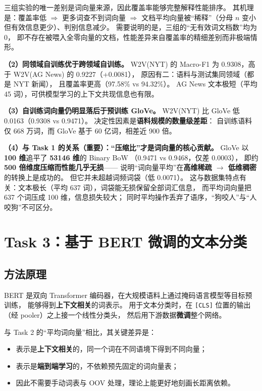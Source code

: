 \documentclass[12pt,a4paper]{ctexart}
\newcommand{\fpath}[1]{\texttt{#1}}
\begin{document}
三组实验的唯一差别是词向量来源，因此覆盖率能够完整解释性能排序。
其机理是：覆盖率低 $\Rightarrow$ 更多词查不到词向量
$\Rightarrow$ 文档平均向量被``稀释''（分母 $n$ 变小但有效信息更少）、判别信息减少。
需要说明的是，三组的``无有效词文档数''均为 0，
即不存在被喂入全零向量的文档，性能差异来自覆盖率的精细差别而非极端情形。

\textbf{（2）同领域自训练优于跨领域自训练。}
W2V(NYT) 的 Macro-F1 为 0.9308，高于 W2V(AG News) 的 0.9227（+0.0081），
原因有二：语料与测试集同领域（都是 NYT 新闻），
且覆盖率更高（97.58\% vs 94.32\%）。
AG News 文本极短（平均 45 词），可供模型学习的上下文共现信息也有限。

\textbf{（3）自训练词向量仍明显落后于预训练 GloVe。}
W2V(NYT) 比 GloVe 低 0.0163（0.9308 vs 0.9471）。
决定性因素是\textbf{语料规模的数量级差距}：
自训练语料仅 668 万词，而 GloVe 基于 60 亿词，相差近 900 倍。

\textbf{（4）与 Task 1 的关系（重要）：``压缩比''才是词向量的核心贡献。}
GloVe 以 \textbf{100 维}追平了 \textbf{53146 维}的 Binary BoW
（0.9471 vs 0.9468，仅差 0.0003），
即约 \textbf{500 倍维度压缩而性能几乎无损}——
说明``词向量平均''在\textbf{高维稀疏 $\to$ 低维稠密}的转换上是成功的。
但它并未超越词频词袋（低 0.0071）。
这与数据集特点有关：文本极长（平均 637 词），词袋能无损保留全部词汇信息，
而平均词向量把 637 个词压成 100 维，信息损失较大；
同时平均操作丢弃了语序，``狗咬人''与``人咬狗''不可区分。

\section{Task 3：基于 BERT 微调的文本分类}

\subsection{方法原理}

BERT 是双向 Transformer 编码器，在大规模语料上通过掩码语言模型等目标预训练，
能够得到\textbf{上下文相关}的词表示。
用于文本分类时，在 \fpath{[CLS]} 位置的输出（经 pooler）之上接一个线性分类头，
然后用下游数据\textbf{微调}整个网络。

与 Task 2 的``平均词向量''相比，其关键差异是：
\begin{itemize}
  \item 表示是\textbf{上下文相关}的，同一个词在不同语境下得到不同向量；
  \item 表示是\textbf{端到端学习}的，不依赖预先固定的词向量表；
  \item 因此不需要手动词表与 OOV 处理，理论上能更好地刻画长距离依赖。
\end{itemize}
\end{document}
